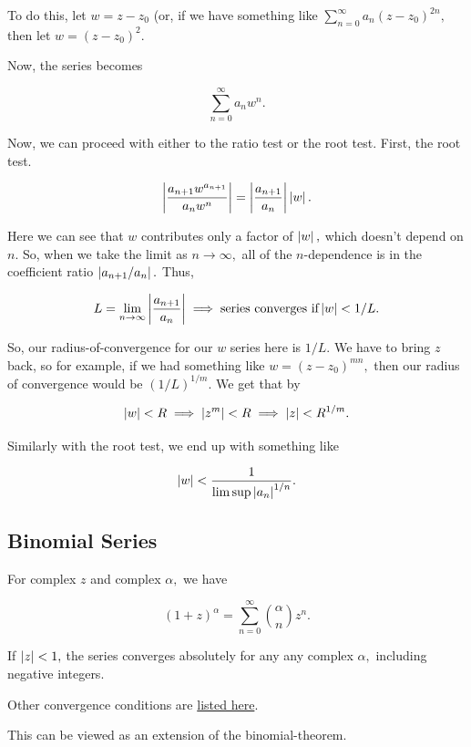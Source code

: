 \documentclass{article}
\begin{document}
To do this, let $w = z - z_0$ (or, if we have something like $\sum_{n=0}^{\infty} a_n (z - z_0)^{2n},$ then let $w = (z-z_0)^2.$

Now, the series becomes

\[ \sum_{n=0}^{\infty} a_n w^n. \]

Now, we can proceed with either to the ratio test or the root test. First, the root test.

\[ \left| \frac{a_{n+1}w^{a_{n+1}}}{a_n w^n} \right| = \left| \frac{a_{n+1}}{a_n} \right| \left| w \right|. \]

Here we can see that $w$ contributes only a factor of $\left| w \right|,$ which doesn't depend on $n.$ So, when we take the limit as $n \to \infty,$ all of the $n$-dependence is in the coefficient ratio $\left| a_{n+1}/a_n \right|.$ Thus,

\[ L = \lim_{n \to \infty} \left| \frac{a_{n+1}}{a_n} \right| \implies \text{series converges if} \left| w \right| < 1/L. \]

So, our \@{radius-of-convergence} for our $w$ series here is $1/L.$ We have to bring $z$ back, so for example, if we had something like $w = (z - z_0)^{mn},$ then our radius of convergence would be $(1/L)^{1/m}.$ We get that by

\[ \left| w \right| < R \implies \left| z^m \right| < R \implies \left| z \right| < R^{1/m}. \]

Similarly with the root test, we end up with something like

\[ \left| w \right| < \frac{1}{\limsup{\left| a_n \right|^{1/n}}}. \]

\subsection{Binomial Series}

\begin{theorem}\label{binomial-series}
For complex $z$ and complex $\alpha,$ we have

\[ (1 + z)^{\alpha} = \sum_{n=0}^{\infty} \binom{\alpha}{n} z^n. \]

If $\left| z \right| < 1,$ the series \@{converges} absolutely for any any complex $\alpha,$ including negative integers.

Other convergence conditions are \href{https://en.wikipedia.org/wiki/Binomial_series}{listed here}.
\end{theorem}

\detach

\begin{remark}
This can be viewed as an extension of the \@{binomial-theorem}.
\end{remark}
\end{document}
